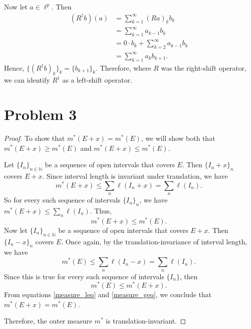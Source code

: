 \documentclass{article}
\begin{document}
Now let $a\in\ell^p$. Then 
\begin{align}
	\left(R^{\dagger}b\right)(a) &= \sum_{k=1}^{\infty}\left(Ra\right)_k b_k \\
	&= \sum_{k=1}^{\infty} a_{k-1}b_k \\
	&= 0\cdot b_k + \sum_{k=2}^{\infty}a_{k-1}b_k \\
	&= \sum_{k=1}^{\infty}a_k b_{k+1}. 
\end{align}
Hence, $\{\left(R^{\dagger}b\right)_k\}_k = \{b_{k+1}\}_k$. Therefore, where $R$ was the right-shift operator, we can identify $R^{\dagger}$ as a left-shift operator.

\section*{Problem 3}
\begin{proof}
	To show that $m^*(E+x)=m^*(E)$, we will show both that \\$m^*(E+x)\geq m^*(E)$ and $m^*(E+x)\leq m^*(E)$.
	
	Let $\{I_n\}_{n\in\mathbb{N}}$ be a sequence of open intervals that covers $E$. Then $\{I_n + x\}_n$ covers $E+x$. Since interval length is invariant under translation, we have
	\begin{equation}
		m^*(E+x) \leq \sum_n \ell(I_n+x) = \sum_n\ell(I_n).
	\end{equation}
	So for every such sequence of intervals $\{I_n\}_n$, we have $m^*(E+x)\leq \sum_n\ell(I_n)$. Thus, 
	\begin{equation}\label{measure_leq}
		m^*(E+x)\leq m^*(E).
	\end{equation}
	Now let $\{I_n\}_{n\in\mathbb{N}}$ be a sequence of open intervals that covers $E+x$. Then $\{I_n-x\}_n$ covers $E$. Once again, by the translation-invariance of interval length, we have
	\begin{equation}
		m^*(E) \leq \sum_n\ell(I_n-x) = \sum_n\ell(I_n).
	\end{equation}
	Since this is true for every such sequence of intervals $\{I_n\}$, then
	\begin{equation}\label{measure_geq}
		m^*(E) \leq m^*(E+x).
	\end{equation}
	From equations \eqref{measure_leq} and \eqref{measure_geq}, we conclude that $m^*(E+x)=m^*(E)$.
	
	Therefore, the outer measure $m^*$ is translation-invariant.
\end{proof}
\end{document}
